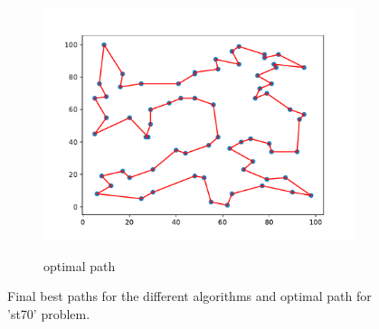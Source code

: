 \documentclass[12pt]{article}
\theoremstyle{plain}
\theoremstyle{definition}
\theoremstyle{remark}
\begin{document}
\begin{figure}[ht]
\begin{subfigure}{.5\textwidth}
		\includegraphics[scale = 0.44]{../../Implementation/gen/optimal_path_st70}
		\label{fig:optimal_path_st70}
		\caption{optimal path}
	\end{subfigure}
	\caption{Final best paths for the different algorithms and optimal path for 'st70' problem.}
	\label{fig:final_paths_st70}
\end{figure}
\newpage
\end{document}
